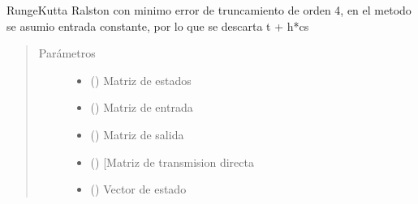 \documentclass[letterpaper,10pt,spanish]{sphinxmanual}
\begin{document}
\begin{fulllineitems}
\label{\detokenize{codigos/rk_generator:rk_generator.ralston4}}
Runge\sphinxhyphen{}Kutta Ralston con minimo error de truncamiento de orden 4, en el metodo se asumio entrada constante, por lo que se descarta t + h*cs
\begin{quote}\begin{description}
\item[{Parámetros}] \leavevmode\begin{itemize}
\item {} 
 (\sphinxstyleliteralemphasis{\sphinxupquote{, }}\sphinxstyleliteralemphasis{\sphinxupquote{, }}) \textendash{} Matriz de estados

\item {} 
 (\sphinxstyleliteralemphasis{\sphinxupquote{, }}\sphinxstyleliteralemphasis{\sphinxupquote{, }}) \textendash{} Matriz de entrada

\item {} 
 (\sphinxstyleliteralemphasis{\sphinxupquote{, }}\sphinxstyleliteralemphasis{\sphinxupquote{, }}) \textendash{} Matriz de salida

\item {} 
 (\sphinxstyleliteralemphasis{\sphinxupquote{, }}\sphinxstyleliteralemphasis{\sphinxupquote{, }}) \textendash{} {[}Matriz de transmision directa

\item {} 
 (\sphinxstyleliteralemphasis{\sphinxupquote{, }}\sphinxstyleliteralemphasis{\sphinxupquote{, }}) \textendash{} Vector de estado


\end{itemize}
\end{description}
\end{quote}
\end{fulllineitems}
\end{document}
